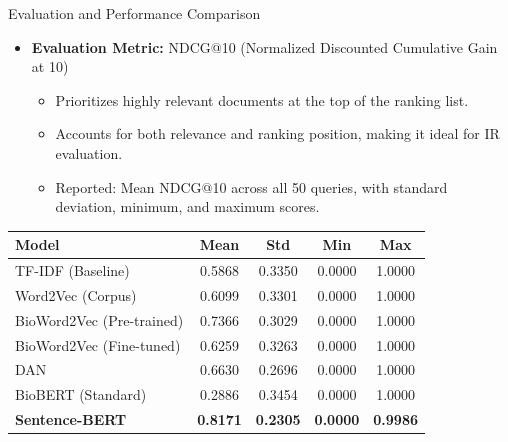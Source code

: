 \documentclass[10pt, french]{beamer}
\begin{document}
\begin{frame}{Evaluation and Performance Comparison}

    \begin{itemize}
        \item \textbf{Evaluation Metric:} NDCG@10 (Normalized Discounted Cumulative Gain at 10)
        \begin{itemize}
            \item Prioritizes highly relevant documents at the top of the ranking list.
            \item Accounts for both relevance and ranking position, making it ideal for IR evaluation.
            \item Reported: Mean NDCG@10 across all 50 queries, with standard deviation, minimum, and maximum scores.
        \end{itemize}
    \end{itemize}

    \vspace{0.5cm}
    
    \centering
    \renewcommand{\arraystretch}{1.2}
    \begin{tabular}{l | c c c c}
  \textbf{Model} & \textbf{Mean} & \textbf{Std} & \textbf{Min} & \textbf{Max} \\
    \hline
    TF-IDF (Baseline)         & 0.5868 & 0.3350 & 0.0000 & 1.0000 \\
    Word2Vec (Corpus)         & 0.6099 & 0.3301 & 0.0000 & 1.0000 \\
    BioWord2Vec (Pre-trained) & 0.7366 & 0.3029 & 0.0000 & 1.0000 \\
    BioWord2Vec (Fine-tuned)  & 0.6259 & 0.3263 & 0.0000 & 1.0000 \\
    DAN                       & 0.6630 & 0.2696 & 0.0000 & 1.0000 \\
    BioBERT (Standard)        & 0.2886 & 0.3454 & 0.0000 & 1.0000 \\
    \hline
    \textbf{Sentence-BERT}    & \textbf{0.8171} & \textbf{0.2305} & \textbf{0.0000} & \textbf{0.9986} \\
\end{tabular}

\end{frame}
\end{document}

